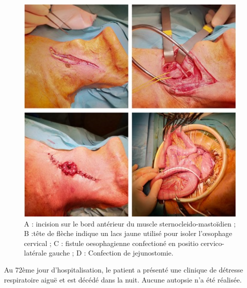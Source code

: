 \documentclass[./tfe]{subfiles}
\begin{document}
\begin{figure}[!h]
    \centering
    \includegraphics[width=\textwidth]{images/chirurgie.jpg}
    \caption{A : incision sur le bord antérieur du muscle sternocleido-mastoïdien ; B :tête de flèche indique un lacs jaune utilisé pour isoler l’œsophage cervical ; C : fistule oesophagienne confectioné en positio cervico-latérale gauche ; D : Confection de jejunostomie.}
    \label{fig:chirurgie}
\end{figure}

Au 72ème jour d’hospitalisation, le patient a présenté une clinique de détresse respiratoire aiguë et est décédé dans la nuit. Aucune autopsie n'a été réalisée.
\end{document}

